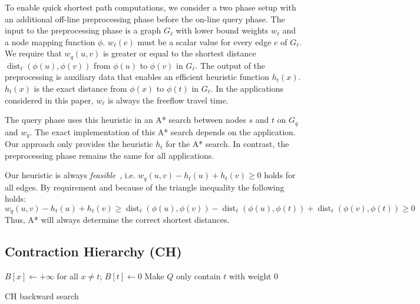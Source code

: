 \documentclass[a4paper,UKenglish,cleveref, autoref, thm-restate]{lipics-v2021}
\begin{document}
To enable quick shortest path computations, we consider a two phase setup with an additional off-line preprocessing phase before the on-line query phase.
The input to the preprocessing phase is a graph $G_\ell$ with lower bound weights $w_\ell$ and a node mapping function $\phi$.
$w_\ell(e)$ must be a scalar value for every edge $e$ of $G_\ell$.
We require that $w_q(u,v)$ is greater or equal to the shortest distance $\operatorname{dist}_\ell(\phi(u), \phi(v))$ from $\phi(u)$ to $\phi(v)$ in $G_\ell$. %
The output of the preprocessing is auxiliary data that enables an efficient heuristic function $h_t(x)$.
$h_t(x)$ is the exact distance from $\phi(x)$ to $\phi(t)$ in $G_\ell$.
In the applications considered in this paper, $w_\ell$ is always the freeflow travel time.

The query phase uses this heuristic in an A* search between nodes $s$ and $t$ on $G_q$ and $w_q$.
The exact implementation of this A* search depends on the application.
Our approach only provides the heuristic $h_t$ for the A* search.
In contrast, the preprocessing phase remains the same for all applications.

Our heuristic is always \emph{feasible}~\cite{hnr-afbhd-68}, i.e. $w_q(u,v) - h_t(u) + h_t(v) \geq 0$ holds for all edges.
By requirement and because of the triangle inequality the following holds:
\[
w_q(u,v) - h_t(u) + h_t(v) \geq \operatorname{dist}_\ell(\phi(u), \phi(v)) - \operatorname{dist}_\ell(\phi(u), \phi(t)) + \operatorname{dist}_\ell(\phi(v), \phi(t)) \geq 0
\]
Thus, A* will always determine the correct shortest distances.

\subsection{Contraction Hierarchy (CH)}

\begin{algorithm2e}
$B[x] \leftarrow +\infty$ for all $x\neq t$;
$B[t] \leftarrow 0$\;
Make $Q$ only contain $t$ with weight $0$\;
\caption{CH backward search}
\label{algo:ch-backward}
\end{algorithm2e}
\end{document}
